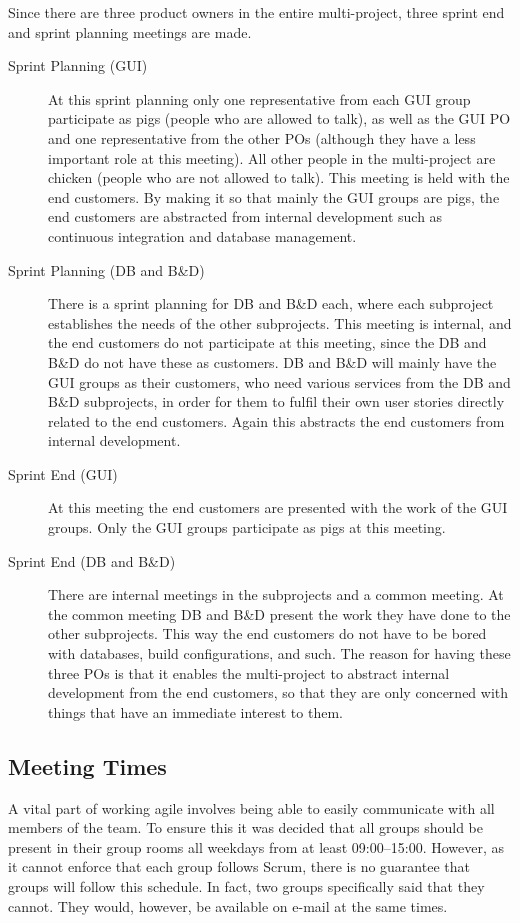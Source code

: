 Since there are three product owners in the entire multi-project, three sprint end and sprint planning meetings are made.

\begin{description}
  \item[Sprint Planning (GUI)] At this sprint planning only one representative from each GUI group participate as pigs (people who are allowed to talk), as well as the GUI PO and one representative from the other POs (although they have a less important role at this meeting). All other people in the multi-project are chicken (people who are not allowed to talk). This meeting is held with the end customers. By making it so that mainly the GUI groups are pigs, the end customers are abstracted from internal development such as continuous integration and database management.
  \item[Sprint Planning (DB and B\&D)] There is a sprint planning for DB and B\&D each, where each subproject establishes the needs of the other subprojects. This meeting is internal, and the end customers do not participate at this meeting, since the DB and B\&D do not have these as customers. DB and B\&D will mainly  have the GUI groups as their customers, who need various services from the DB and B\&D subprojects, in order for them to fulfil their own user stories directly related to the end customers. Again this abstracts the end customers from internal development.
  \item[Sprint End (GUI)] At this meeting the end customers are presented with the work of the GUI groups. Only the GUI groups participate as pigs at this meeting.
  \item[Sprint End (DB and B\&D)] There are internal meetings in the subprojects and a common meeting. At the common meeting DB and B\&D present the work they have done to the other subprojects. This way the end customers do not have to be bored with databases, build configurations, and such. The reason for having these three POs is that it enables the multi-project to abstract internal development from the end customers, so that they are only concerned with things that have an immediate interest to them.
\end{description}

\subsection{Meeting Times}
A vital part of working agile involves being able to easily communicate with all members of the team. To ensure this it was decided that all groups should be present in their group rooms all weekdays from at least 09:00--15:00. However, as it cannot enforce that each group follows Scrum, there is no guarantee that groups will follow this schedule. In fact, two groups specifically said that they cannot. They would, however, be available on e-mail at the same times.


